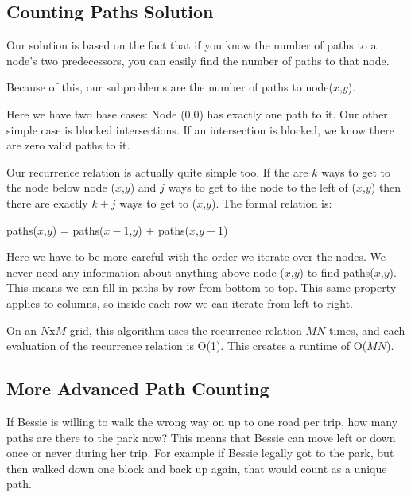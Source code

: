 \documentclass[11pt]{article}
\begin{document}
\subsection{Counting Paths Solution}

Our solution is based on the fact that if you know the number of paths to a node's two predecessors, you can easily find the number of paths to that node.

Because of this, our subproblems are the number of paths to node($x$,$y$).

Here we have two base cases: Node (0,0) has exactly one path to it.  Our other simple case is blocked intersections.  If an intersection is blocked, we know there are zero valid paths to it.

Our recurrence relation is actually quite simple too.  If the are $k$ ways to get to the node below node ($x$,$y$) and $j$ ways to get to the node to the left of ($x$,$y$) then there are exactly $k+j$ ways to get to ($x$,$y$).  The formal relation is:

paths($x$,$y$) = paths($x-1$,$y$) + paths($x$,$y-1$)
\newline

Here we have to be more careful with the order we iterate over the nodes.  We never need any information about anything above node ($x$,$y$) to find paths($x$,$y$).  This means we can fill in paths by row from bottom to top.  This same property applies to columns, so inside each row we can iterate from left to right.

On an $N$x$M$ grid, this algorithm uses the recurrence relation $MN$ times, and each evaluation of the recurrence relation is O(1).  This creates a runtime of O($MN$).

\subsection{More Advanced Path Counting}
If Bessie is willing to walk the wrong way on up to one road per trip, how many paths are there to the park now?  This means that Bessie can move left or down once or never during her trip.  For example if Bessie legally got to the park, but then walked down one block and back up again, that would count as a unique path.
\end{document}
